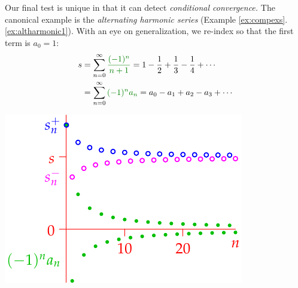 \begin{minipage}[t]{0.6\linewidth}\vspace{0pt}
	
	Our final test is unique in that it can detect \emph{conditional convergence.} The canonical example is the \emph{alternating harmonic series} (Example \ref*{ex:compexs}.\ref{ex:altharmonic1}). With an eye on generalization, we re-index so that the first term is $a_0=1$:
		\begin{align*}
			s&=\sum_{n=0}^\infty\textcolor{Green}{\frac{(-1)^{n}}{n+1}} =1-\frac 12+\frac 13-\frac 14+\cdots\\
			&=\sum_{n=0}^\infty\textcolor{Green}{(-1)^{n}a_n} =a_0-a_1+a_2-a_3+\cdots
		\end{align*}
\end{minipage}
\hfill
\begin{minipage}[t]{0.39\linewidth}\vspace{5pt}
	\flushright\includegraphics[scale=0.95]{alternatingharmonic}
\end{minipage}
\medbreak

